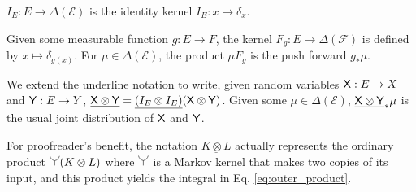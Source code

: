 $I_E:E\to \Delta(\mathcal{E})$ is the identity kernel $I_E:x\mapsto \delta_x$. 

Given some measurable function $g:E\to F$, the kernel $F_g:E\to \Delta(\mathcal{F})$ is defined by $x\mapsto \delta_{g(x)}$. For $\mu\in \Delta(\mathcal{E})$, the product $\mu F_g$ is the push forward $g_*\mu$.

We extend the underline notation to write, given random variables $\mathsf{X}:E\to X$ and $\mathsf{Y}:E\to Y$, $\underline{\mathsf{X}\otimes\mathsf{Y}}=\underline{(I_E\otimes I_E)}(\mathsf{X}\otimes \mathsf{Y})$. Given some $\mu\in \Delta(\mathcal{E})$, $\underline{\mathsf{X}\otimes\mathsf{Y}}_*\mu$ is the usual joint distribution of $\mathsf{X}$ and $\mathsf{Y}$.

For proofreader's benefit, the notation $\underline{K\otimes L}$ actually represents the ordinary product $\splitter{0.15}(K\otimes L)$ where $\splitter{0.15}$ is a Markov kernel that makes two copies of its input, and this product yields the integral in Eq. \ref{eq:outer_product}.